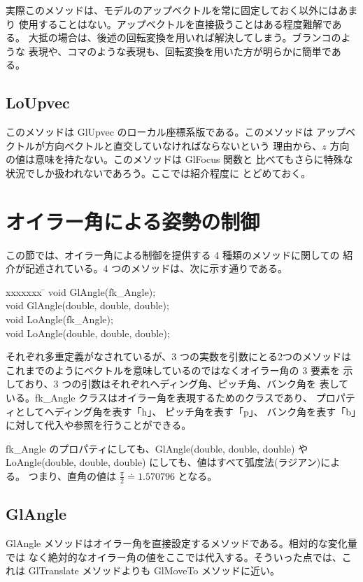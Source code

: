 実際このメソッドは、モデルのアップベクトルを常に固定しておく以外にはあまり
使用することはない。アップベクトルを直接扱うことはある程度難解である。
大抵の場合は、後述の回転変換を用いれば解決してしまう。ブランコのような
表現や、コマのような表現も、回転変換を用いた方が明らかに簡単である。

\subsection{LoUpvec}
このメソッドは GlUpvec のローカル座標系版である。このメソッドは
アップベクトルが方向ベクトルと直交していなければならないという
理由から、\(z\) 方向の値は意味を持たない。このメソッドは GlFocus 関数と
比べてもさらに特殊な状況でしか扱われないであろう。ここでは紹介程度に
とどめておく。

\section{オイラー角による姿勢の制御}
この節では、オイラー角による制御を提供する 4 種類のメソッドに関しての
紹介が記述されている。4 つのメソッドは、次に示す通りである。
\begin{bf}
\begin{tabbing}
xxxxxxx \= \kill
\> void GlAngle(fk\_Angle); \\
\> void GlAngle(double, double, double); \\
\> void LoAngle(fk\_Angle); \\
\> void LoAngle(double, double, double); \\
\end{tabbing}
\end{bf}
それぞれ多重定義がなされているが、3 つの実数を引数にとる2つのメソッドは
これまでのようにベクトルを意味しているのではなくオイラー角の 3 要素を
示しており、3 つの引数はそれぞれヘディング角、ピッチ角、バンク角を
表している。fk\_Angle クラスはオイラー角を表現するためのクラスであり、
プロパティとしてヘディング角を表す「h」、
ピッチ角を表す「p」、
バンク角を表す「b」に対して代入や参照を行うことができる。

fk\_Angle のプロパティにしても、GlAngle(double, double, double) や
LoAngle(double, double, double) にしても、値はすべて弧度法(ラジアン)による。
つまり、直角の値は \(\frac{\pi}{2} \doteq 1.570796\) となる。

\subsection{GlAngle}
GlAngle メソッドはオイラー角を直接設定するメソッドである。相対的な変化量では
なく絶対的なオイラー角の値をここでは代入する。そういった点では、これは
GlTranslate メソッドよりも GlMoveTo メソッドに近い。

